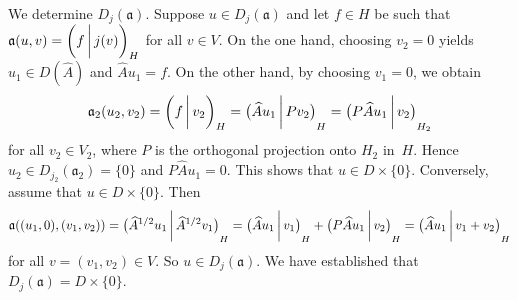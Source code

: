 \documentclass[a4paper,oneside,12pt]{amsart}
\theoremstyle{plain}
\theoremstyle{definition}
\newenvironment{example}
{\pushQED{\qed}

\examplex}
{\popQED\endexamplex}
\begin{document}
\begin{example}
We determine $D_j({{\mathfrak{{a}}}})$. Suppose $u\in D_j({{\mathfrak{{a}}}})$ and let $f\in H$ be such that ${{\mathfrak{{a}}}}(u,v)={{\ifthenelse{\equal{auto}{auto}}{\left({f}\mkern3mu{\biggm|}\mkern3mu {j(v)}\right)}{}
\ifthenelse{\equal{auto}{b}}{\bigl({f}\mkern3mu{\biggm|}\mkern3mu {j(v)}\bigr)}{}
\ifthenelse{\equal{auto}{B}}{\Bigl({f}\mkern3mu{\bigm|}\mkern3mu {j(v)}\Bigr)}{}
}}_H$ for all $v\in V$.
On the one hand, choosing $v_2=0$ yields $u_1\in D(\widehat{A})$ and $\widehat{A} u_1=f$.
On the other hand, by choosing $v_1=0$, we obtain 
\[
    {{\mathfrak{{a}}}}_2(u_2,v_2) = {{\ifthenelse{\equal{auto}{auto}}{\left({f}\mkern3mu{\biggm|}\mkern3mu {v_2}\right)}{}
\ifthenelse{\equal{auto}{b}}{\bigl({f}\mkern3mu{\biggm|}\mkern3mu {v_2}\bigr)}{}
\ifthenelse{\equal{auto}{B}}{\Bigl({f}\mkern3mu{\bigm|}\mkern3mu {v_2}\Bigr)}{}
}}_H = {{\ifthenelse{\equal{b}{auto}}{\left({\widehat{A}u_1}\mkern3mu{\biggm|}\mkern3mu {Pv_2}\right)}{}
\ifthenelse{\equal{b}{b}}{\bigl({\widehat{A}u_1}\mkern3mu{\biggm|}\mkern3mu {Pv_2}\bigr)}{}
\ifthenelse{\equal{b}{B}}{\Bigl({\widehat{A}u_1}\mkern3mu{\bigm|}\mkern3mu {Pv_2}\Bigr)}{}
}}_H={{\ifthenelse{\equal{b}{auto}}{\left({P\widehat{A} u_1}\mkern3mu{\biggm|}\mkern3mu {v_2}\right)}{}
\ifthenelse{\equal{b}{b}}{\bigl({P\widehat{A} u_1}\mkern3mu{\biggm|}\mkern3mu {v_2}\bigr)}{}
\ifthenelse{\equal{b}{B}}{\Bigl({P\widehat{A} u_1}\mkern3mu{\bigm|}\mkern3mu {v_2}\Bigr)}{}
}}_{H_2}
\]
for all $v_2\in V_2$, 
where $P$ is the orthogonal projection onto $H_2$ in~$H$.
Hence $u_2\in D_{j_2}({{\mathfrak{{a}}}}_2)=\{0\}$ and $P\widehat{A}u_1=0$. This shows that $u\in D\times \{0\}$.
Conversely, assume that $u\in D\times\{0\}$. Then
\[
    {{\mathfrak{{a}}}}((u_1,0),(v_1,v_2)) = {{\ifthenelse{\equal{b}{auto}}{\left({\widehat{A}^{1/2}u_1}\mkern3mu{\biggm|}\mkern3mu {\widehat{A}^{1/2}v_1}\right)}{}
\ifthenelse{\equal{b}{b}}{\bigl({\widehat{A}^{1/2}u_1}\mkern3mu{\biggm|}\mkern3mu {\widehat{A}^{1/2}v_1}\bigr)}{}
\ifthenelse{\equal{b}{B}}{\Bigl({\widehat{A}^{1/2}u_1}\mkern3mu{\bigm|}\mkern3mu {\widehat{A}^{1/2}v_1}\Bigr)}{}
}}_H 
    = {{\ifthenelse{\equal{b}{auto}}{\left({\widehat{A} u_1}\mkern3mu{\biggm|}\mkern3mu {v_1}\right)}{}
\ifthenelse{\equal{b}{b}}{\bigl({\widehat{A} u_1}\mkern3mu{\biggm|}\mkern3mu {v_1}\bigr)}{}
\ifthenelse{\equal{b}{B}}{\Bigl({\widehat{A} u_1}\mkern3mu{\bigm|}\mkern3mu {v_1}\Bigr)}{}
}}_H + {{\ifthenelse{\equal{b}{auto}}{\left({P \widehat{A} u_1}\mkern3mu{\biggm|}\mkern3mu {v_2}\right)}{}
\ifthenelse{\equal{b}{b}}{\bigl({P \widehat{A} u_1}\mkern3mu{\biggm|}\mkern3mu {v_2}\bigr)}{}
\ifthenelse{\equal{b}{B}}{\Bigl({P \widehat{A} u_1}\mkern3mu{\bigm|}\mkern3mu {v_2}\Bigr)}{}
}}_H = {{\ifthenelse{\equal{b}{auto}}{\left({\widehat{A} u_1}\mkern3mu{\biggm|}\mkern3mu {v_1+v_2}\right)}{}
\ifthenelse{\equal{b}{b}}{\bigl({\widehat{A} u_1}\mkern3mu{\biggm|}\mkern3mu {v_1+v_2}\bigr)}{}
\ifthenelse{\equal{b}{B}}{\Bigl({\widehat{A} u_1}\mkern3mu{\bigm|}\mkern3mu {v_1+v_2}\Bigr)}{}
}}_H
\]
for all $v=(v_1,v_2)\in V$. So $u\in D_j({{\mathfrak{{a}}}})$. We have established that $D_j({{\mathfrak{{a}}}})=D\times\{0\}$.


\end{example}
\end{document}
